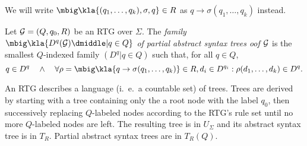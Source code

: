 We will write $\mbig\kla{(q_1,\ldots,q_k),\sigma,q}\in R$ as $q\to\sigma(q_1,\ldots,q_k)$ instead.

\begin{definition}
 Let $\mathcal G=(Q,q_0,R)$ be an RTG over $\Sigma$. The \emph{family
 $\mbig\kla{D^q(\ug)\dmiddle|q\in Q}$ of partial abstract syntax trees oof
 $\mathcal G$} is the smallest $Q$-indexed family $(D^q|q\in Q)$ such that, for all
 $q\in Q$,
 \[
  q \in D^q \quad\wedge\quad \forall \rho=\mbig\kla{q\to\sigma(q_1,\ldots,q_k)}\in R,d_i\in D^{q_i}: \rho(d_1,\ldots,d_k) \in D^q.
 \]
\end{definition}


An RTG describes a language (i.~e.~a countable set) of trees. Trees are derived
by starting with a tree containing only the a root node with the label $q_0$,
then successively replacing $Q$-labeled nodes according to the RTG's rule set
until no more $Q$-labeled nodes are left. The resulting tree is in $U_\Sigma$
and its abstract syntax tree is in $T_R$. Partial abstract syntax trees are in $T_R(Q)$.

